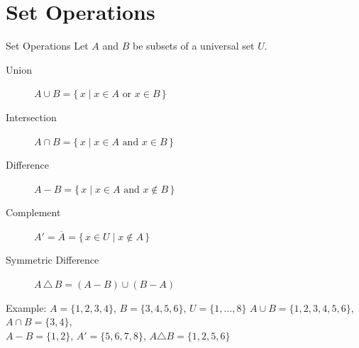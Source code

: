 \documentclass{beamer}
\begin{document}
\section{Set Operations}
\begin{frame}{Set Operations}
  Let $A$ and $B$ be subsets of a universal set $U$.
  \begin{description}
    \item[Union] $A \cup B = \{\, x \mid x \in A \text{ or } x \in B \,\}$
    \item[Intersection] $A \cap B = \{\, x \mid x \in A \text{ and } x \in B \,\}$
    \item[Difference] $A - B = \{\, x \mid x \in A \text{ and } x \notin B \,\}$
    \item[Complement] $A' = \overline{A} = \{\, x \in U \mid x \notin A \,\}$
    \item[Symmetric Difference]
      $A \,\triangle\, B = (A - B) \cup (B - A)$
  \end{description}
  \pause
  \begin{exampleblock}{Example: $A=\{1,2,3,4\}$, $B=\{3,4,5,6\}$, $U=\{1,\dots,8\}$}
    $A \cup B = \{1,2,3,4,5,6\}$,\quad
    $A \cap B = \{3,4\}$,\\
    $A - B = \{1,2\}$,\quad
    $A' = \{5,6,7,8\}$,\quad
    $A \triangle B = \{1,2,5,6\}$
  \end{exampleblock}
\end{frame}
\end{document}
